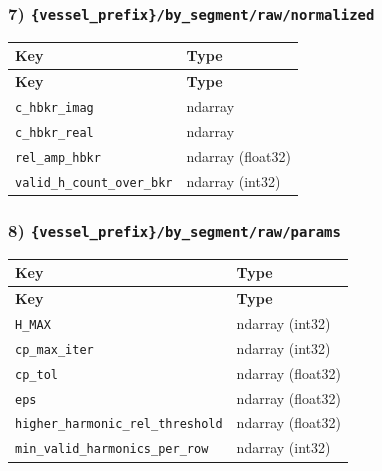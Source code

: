 \documentclass[11pt]{article}
\begin{document}
\subsubsection*{7) \texttt{\{vessel\_\allowbreak{}prefix\}/\allowbreak{}by\_\allowbreak{}segment/\allowbreak{}raw/\allowbreak{}normalized}}
\begin{longtable}{|p{}|p{}|}
\hline
\textbf{Key} & \textbf{Type} \\ \hline
\endfirsthead
\hline
\textbf{Key} & \textbf{Type} \\ \hline
\endhead
\texttt{c\_\allowbreak{}hbkr\_\allowbreak{}imag} & ndarray \\ \hline
\texttt{c\_\allowbreak{}hbkr\_\allowbreak{}real} & ndarray \\ \hline
\texttt{rel\_\allowbreak{}amp\_\allowbreak{}hbkr} & ndarray (float32) \\ \hline
\texttt{valid\_\allowbreak{}h\_\allowbreak{}count\_\allowbreak{}over\_\allowbreak{}bkr} & ndarray (int32) \\ \hline
\end{longtable}

\subsubsection*{8) \texttt{\{vessel\_\allowbreak{}prefix\}/\allowbreak{}by\_\allowbreak{}segment/\allowbreak{}raw/\allowbreak{}params}}
\begin{longtable}{|p{}|p{}|}
\hline
\textbf{Key} & \textbf{Type} \\ \hline
\endfirsthead
\hline
\textbf{Key} & \textbf{Type} \\ \hline
\endhead
\texttt{H\_\allowbreak{}MAX} & ndarray (int32) \\ \hline
\texttt{cp\_\allowbreak{}max\_\allowbreak{}iter} & ndarray (int32) \\ \hline
\texttt{cp\_\allowbreak{}tol} & ndarray (float32) \\ \hline
\texttt{eps} & ndarray (float32) \\ \hline
\texttt{higher\_\allowbreak{}harmonic\_\allowbreak{}rel\_\allowbreak{}threshold} & ndarray (float32) \\ \hline
\texttt{min\_\allowbreak{}valid\_\allowbreak{}harmonics\_\allowbreak{}per\_\allowbreak{}row} & ndarray (int32) \\ \hline
\end{longtable}
\end{document}
